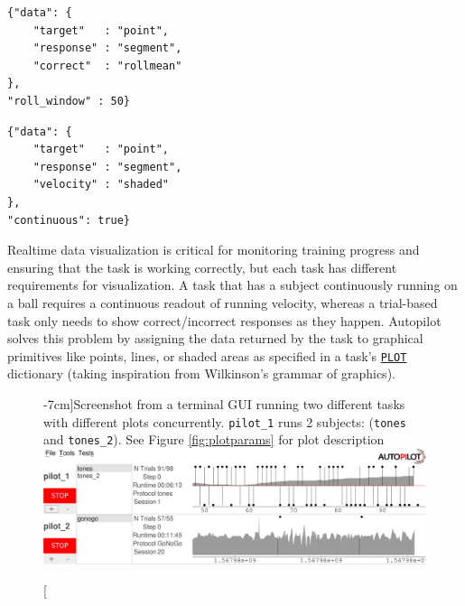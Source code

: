 \documentclass[nohyper, justified, notitlepage, marginals=raggedright,twoside=false,debug]{tufte-autopilot}
\begin{document}
\begin{marginfigure}[-5.5cm]
\begin{verbatim}
{"data": {
    "target"   : "point",
    "response" : "segment",
    "correct"  : "rollmean"
},
"roll_window" : 50}
\end{verbatim}
\begin{verbatim}
{"data": {
    "target"   : "point",
    "response" : "segment",
    "velocity" : "shaded"
},
"continuous": true}
\end{verbatim}
\caption{\texttt{PLOT} parameters for Figure \ref{fig:gui}. In both, "target" and "response" data are mapped to "point" and "segment" graphical primitives, but timestamps rather than trial numbers are used for the x-axis in the "continuous" plot (Figure \ref{fig:gui}, bottom). Additional parameters can be specified, eg. the trial plot (Figure \ref{fig:gui}, top) computes rolling accuracy over the past 50 trials}
\label{fig:plotparams}
\end{marginfigure}

Realtime data visualization is critical for monitoring training progress and ensuring that the task is working correctly, but each task has different requirements for visualization. A task that has a subject continuously running on a ball requires a continuous readout of running velocity, whereas a trial-based task only needs to show correct/incorrect responses as they happen. Autopilot solves this problem by assigning the data returned by the task to graphical primitives like points, lines, or shaded areas as specified in a task's \hyperref[sec:taskcomponents]{\texttt{PLOT}} dictionary (taking inspiration from Wilkinson's grammar of graphics\citep{wilkinsonGrammarGraphics2012}).%
%
\begin{figure}[hb!]
\caption[][-7cm]{Screenshot from a terminal GUI running two different tasks with different plots concurrently. \texttt{pilot\_1} runs 2 subjects: (\texttt{tones} and \texttt{tones\_2}). See Figure \ref{fig:plotparams} for plot description}
\label{fig:gui}
\includegraphics[]{figures/ss_3.png}
\end{figure}
\clearpage
\end{document}
